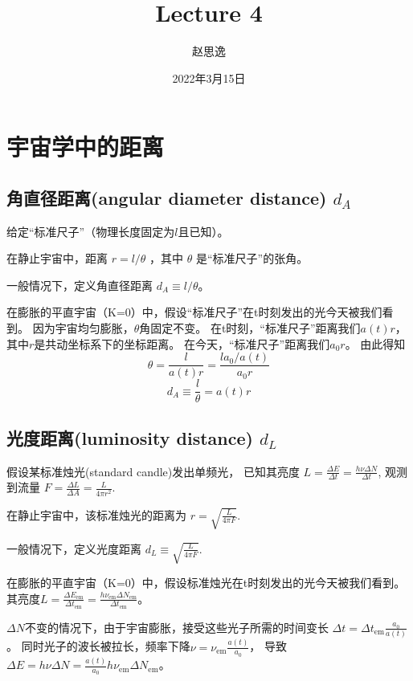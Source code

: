 \documentclass[12pt]{ctexart}
\title{Lecture 4}
\author{赵思逸}
\date{2022年3月15日}
\begin{document}
\maketitle


\section{宇宙学中的距离}

\subsection{角直径距离(angular diameter distance) $d_A$ }

给定“标准尺子”（物理长度固定为$l$且已知）。

在静止宇宙中，距离 $r = l/\theta$ ，其中 $\theta$ 是“标准尺子”的张角。

一般情况下，定义角直径距离 $d_A \equiv l/\theta$。

在膨胀的平直宇宙（K=0）中，假设“标准尺子”在t时刻发出的光今天被我们看到。
因为宇宙均匀膨胀，$\theta$角固定不变。
在t时刻，“标准尺子”距离我们$a(t)r$，其中$r$是共动坐标系下的坐标距离。
在今天，“标准尺子”距离我们$a_0 r$。
由此得知
\begin{equation}
    \theta = \frac{l}{a(t)r} = \frac{l a_0/a(t)}{a_0 r}
\end{equation}
\begin{equation}
    d_A \equiv \frac{l}{\theta} = a(t)r
\end{equation}

\subsection{光度距离(luminosity distance) $d_L$ }

假设某标准烛光(standard candle)发出单频光，
已知其亮度 $L=\frac{\Delta E}{\Delta t} = \frac{h\nu \Delta N}{\Delta t}$,
观测到流量 $F=\frac{\Delta L}{\Delta A} = \frac{L}{4\pi r^2}$.

在静止宇宙中，该标准烛光的距离为 $r=\sqrt{\frac{L}{4\pi F}}$.

一般情况下，定义光度距离 $d_L \equiv \sqrt{\frac{L}{4\pi F}}$.

在膨胀的平直宇宙（K=0）中，假设标准烛光在t时刻发出的光今天被我们看到。
其亮度$L=\frac{\Delta E_\text{em}}{\Delta t_\text{em}} = \frac{h\nu_\text{em} \Delta N_\text{em}}{\Delta t_\text{em}}$。

$\Delta N$不变的情况下，由于宇宙膨胀，接受这些光子所需的时间变长 $\Delta t = \Delta t_\text{em}\frac{a_0}{a(t)}$。
同时光子的波长被拉长，频率下降$\nu=\nu_\text{em}\frac{a(t)}{a_0}$，
导致$\Delta E = h\nu\Delta N=\frac{a(t)}{a_0}h \nu_\text{em} \Delta N_\text{em}$。
\end{document}
